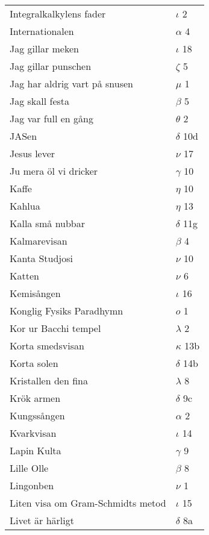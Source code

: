 \documentclass[a6paper,10pt]{article}
\begin{document}
\newpage
\begin{table}[!h]
\begin{tabular}{l l}
Integralkalkylens fader&$\iota$ 2\\
Internationalen&$\alpha$ 4\\
Jag gillar meken&$\iota$ 18\\
Jag gillar punschen&$\zeta$ 5\\
Jag har aldrig vart på snusen&$\mu$ 1\\
Jag skall festa&$\beta$ 5\\
Jag var full en gång&$\theta$ 2\\
JASen&$\delta$ 10d\\
Jesus lever&$\nu$ 17\\
Ju mera öl vi dricker&$\gamma$ 10\\
Kaffe&$\eta$ 10\\
Kahlua&$\eta$ 13\\
Kalla små nubbar&$\delta$ 11g\\
Kalmarevisan&$\beta$ 4\\
Kanta Studjosi&$\nu$ 10\\
Katten&$\nu$ 6\\
Kemisången&$\iota$ 16\\
Konglig Fysiks Paradhymn&$o$ 1\\
Kor ur Bacchi tempel	&$\lambda$ 2\\
Korta smedsvisan&	$\kappa$ 13b\\
Korta solen	&$\delta$ 14b\\
Kristallen den fina&	$\lambda$ 8\\
Krök armen	&$\delta$ 9c\\
Kungssången&	$\alpha$ 2\\
Kvarkvisan	&$\iota$ 14\\
Lapin Kulta&$\gamma$ 9\\
Lille Olle	&$\beta$ 8\\
Lingonben	&$\nu$ 1\\
Liten visa om Gram-Schmidts metod	&$\iota$ 15\\
Livet är härligt&	$\delta$ 8a\\
\end{tabular}
\end{table}
\end{document}
